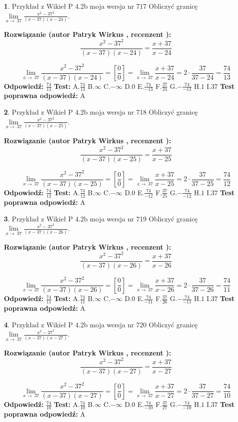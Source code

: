 \documentclass[12pt, a4paper]{article}
\theoremstyle{definition} %
\newtheorem{zad}{}
\newcommand{\zadStart}[1]{\begin{zad}#1\newline}
\newcommand{\zadStop}{\end{zad}}
\newcommand{\rozwStart}[2]{\noindent \textbf{Rozwiązanie (autor #1 , recenzent #2): }\newline}
\newcommand{\rozwStop}{\newline}
\newcommand{\odpStart}{\noindent \textbf{Odpowiedź:}\newline}
\newcommand{\odpStop}{\newline}
\newcommand{\testStart}{\noindent \textbf{Test:}\newline}
\newcommand{\testStop}{\newline}
\newcommand{\kluczStart}{\noindent \textbf{Test poprawna odpowiedź:}\newline}
\newcommand{\kluczStop}{\newline}
\begin{document}
\zadStart{Przykład z Wikieł P 4.2b moja wersja nr 717}
Obliczyć granicę $\lim\limits_{x\to\ 37}\frac{x^{2}-37^{2}}{(x-37)(x-24)}$.
\zadStop
\rozwStart{Patryk Wirkus}{}
$$\frac{x^{2}-37^{2}}{(x-37)(x-24)}=\frac{x+37}{x-24}$$

$$\lim\limits_{x\to\ 37}\frac{x^{2}-37^{2}}{(x-37)(x-24)}=[\frac{0}{0}]=\lim\limits_{x\to\ 37}\frac{x+37}{x-24}=2 \cdot \frac{37}{37-24} = \frac{74}{13}$$
\rozwStop
\odpStart
$\frac{74}{13}$
\odpStop
\testStart
A.$\frac{74}{13}$
B.$\infty$
C.$-\infty$
D.$0$
E.$\frac{74}{-13}$
F.$\frac{37}{24}$
G.$-\frac{74}{-13}$
H.$1$
I.$37$
\testStop
\kluczStart
A
\kluczStop



\zadStart{Przykład z Wikieł P 4.2b moja wersja nr 718}
Obliczyć granicę $\lim\limits_{x\to\ 37}\frac{x^{2}-37^{2}}{(x-37)(x-25)}$.
\zadStop
\rozwStart{Patryk Wirkus}{}
$$\frac{x^{2}-37^{2}}{(x-37)(x-25)}=\frac{x+37}{x-25}$$

$$\lim\limits_{x\to\ 37}\frac{x^{2}-37^{2}}{(x-37)(x-25)}=[\frac{0}{0}]=\lim\limits_{x\to\ 37}\frac{x+37}{x-25}=2 \cdot \frac{37}{37-25} = \frac{74}{12}$$
\rozwStop
\odpStart
$\frac{74}{12}$
\odpStop
\testStart
A.$\frac{74}{12}$
B.$\infty$
C.$-\infty$
D.$0$
E.$\frac{74}{-12}$
F.$\frac{37}{25}$
G.$-\frac{74}{-12}$
H.$1$
I.$37$
\testStop
\kluczStart
A
\kluczStop



\zadStart{Przykład z Wikieł P 4.2b moja wersja nr 719}
Obliczyć granicę $\lim\limits_{x\to\ 37}\frac{x^{2}-37^{2}}{(x-37)(x-26)}$.
\zadStop
\rozwStart{Patryk Wirkus}{}
$$\frac{x^{2}-37^{2}}{(x-37)(x-26)}=\frac{x+37}{x-26}$$

$$\lim\limits_{x\to\ 37}\frac{x^{2}-37^{2}}{(x-37)(x-26)}=[\frac{0}{0}]=\lim\limits_{x\to\ 37}\frac{x+37}{x-26}=2 \cdot \frac{37}{37-26} = \frac{74}{11}$$
\rozwStop
\odpStart
$\frac{74}{11}$
\odpStop
\testStart
A.$\frac{74}{11}$
B.$\infty$
C.$-\infty$
D.$0$
E.$\frac{74}{-11}$
F.$\frac{37}{26}$
G.$-\frac{74}{-11}$
H.$1$
I.$37$
\testStop
\kluczStart
A
\kluczStop



\zadStart{Przykład z Wikieł P 4.2b moja wersja nr 720}
Obliczyć granicę $\lim\limits_{x\to\ 37}\frac{x^{2}-37^{2}}{(x-37)(x-27)}$.
\zadStop
\rozwStart{Patryk Wirkus}{}
$$\frac{x^{2}-37^{2}}{(x-37)(x-27)}=\frac{x+37}{x-27}$$

$$\lim\limits_{x\to\ 37}\frac{x^{2}-37^{2}}{(x-37)(x-27)}=[\frac{0}{0}]=\lim\limits_{x\to\ 37}\frac{x+37}{x-27}=2 \cdot \frac{37}{37-27} = \frac{74}{10}$$
\rozwStop
\odpStart
$\frac{74}{10}$
\odpStop
\testStart
A.$\frac{74}{10}$
B.$\infty$
C.$-\infty$
D.$0$
E.$\frac{74}{-10}$
F.$\frac{37}{27}$
G.$-\frac{74}{-10}$
H.$1$
I.$37$
\testStop
\kluczStart
A
\kluczStop
\end{document}
